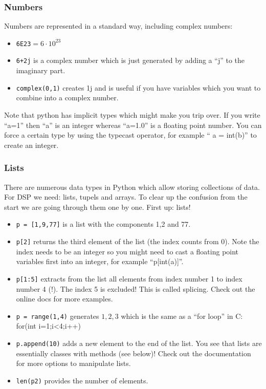 \documentclass[12pt,a4paper]{article}
\begin{document}
\subsubsection{Numbers}
Numbers are represented in a standard way, including complex numbers:
\begin{itemize}
\item \texttt{6E23}$=6\cdot 10^{23}$
\item \texttt{6+2j} is a complex number which is just generated
  by adding a ``j'' to the imaginary part.
\item \texttt{complex(0,1)} creates 1j and is useful if you have
  variables which you want to combine into a complex number.
\end{itemize}
Note that python has implicit types which might make you trip
over. If you write ``a=1'' then ``a'' is an integer whereas
``a=1.0'' is a floating point number. You can force a certain type by using
the typecast operator, for example `` a = int(b)'' to create an integer.

\subsubsection{Lists}
There are numerous data types in Python which allow storing
collections of data. For DSP we need: lists, tupels and arrays. To clear
up the confusion from the start we are going through them one
by one. First up: lists!
\begin{itemize}
\item \texttt{p~=~[1,9,77]} is a list with the components 1,2 and 77.
\item \texttt{p[2]} returns the third element of the list (the index
  counts from 0). Note the index needs to be an integer so you might
  need to cast a floating point variables first into an integer, for example
  ``p[int(a)]''.
\item \texttt{p[1:5]} extracts from the list all elements from
  index number 1 to index number 4 (!). The index 5 is excluded!
  This is called splicing. Check out the online docs
  for more examples.
\item \texttt{p~=~range(1,4)} generates $1, 2, 3$ which is the same as
  a ``for loop'' in C: for(int i=1;i<4;i++)
\item \texttt{p.append(10)} adds a new element to the end of the
  list. You see that lists are essentially classes with methods (see below)!
  Check out the documentation for more options to manipulate lists.
\item \texttt{len(p2)} provides the number of elements.
\end{itemize}
\end{document}
